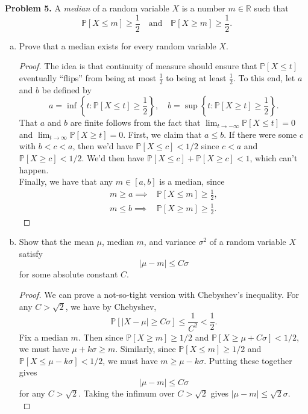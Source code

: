\documentclass[11pt,letterpaper]{report}
\newcommand{\reals}{\mathbb{R}}
\newcommand{\Prob}{\mathbb{P}}
\begin{document}
\noindent\textbf{Problem 5. }
A \textit{median} of a random variable $X$ is a number $m\in \reals$ such that
\[
\Prob[X\leq m]\geq \frac{1}{2}\quad\text{and}\quad \Prob[X\geq m]\geq \frac{1}{2}.
\]
\begin{enumerate}[(a)]
	\item Prove that a median exists for every random variable $X$.
	\begin{proof}
		The idea is that continuity of measure should ensure that $\Prob[X\leq t]$ eventually ``flips'' from being at most $\frac{1}{2}$ to being at least $\frac{1}{2}$. To this end, let $a$ and $b$ be defined by
		\[
		a = \inf\left\{t: \Prob[X\leq t]\geq \frac{1}{2}\right\},\quad b = \sup\left\{t: \Prob[X\geq t]\geq \frac{1}{2}\right\}.
		\]
		That $a$ and $b$ are finite follows from the fact that $\lim_{t\to -\infty}\Prob[X\leq t] = 0$ and $\lim_{t\to \infty}\Prob[X\geq t] = 0$. First, we claim that $a\leq b$. If there were some $c$ with $b<c<a$, then we'd have $\Prob[X\leq c]< 1/2$ since $c<a$ and $\Prob[X\geq c]<1/2$. We'd then have $\Prob[X\leq c] + \Prob[X\geq c]<1$, which can't happen.\\

		\noindent Finally, we have that any $m\in [a,b]$ is a median, since
		\begin{align*}
			m\geq a\implies & \Prob[X\leq m]\geq \frac{1}{2},\\
			m\leq b\implies & \Prob[X\geq m]\geq \frac{1}{2}.
		\end{align*}
	\end{proof}

	\item Show that the mean $\mu$, median $m$, and variance $\sigma^2$ of a random variable $X$ satisfy
	\[
	|\mu-m|\leq C\sigma
	\]
	for some absolute constant $C$.
	\begin{proof}
		We can prove a not-so-tight version with Chebyshev's inequality. For any $C>\sqrt{2}$, we have by Chebyshev,
		\[
		\Prob[|X-\mu|\geq C\sigma]\leq \frac{1}{C^2}<\frac{1}{2}.
		\]
		Fix a median $m$. Then since $\Prob[X\geq m]\geq 1/2$ and $\Prob[X\geq \mu+C\sigma]<1/2$, we must have $\mu+k\sigma\geq m$. Similarly, since $\Prob[X\leq m]\geq 1/2$ and $\Prob[X\leq \mu-k\sigma]<1/2$, we must have $m\geq \mu-k\sigma$. Putting these together gives
		\[
		|\mu-m|\leq C\sigma
		\]
		for any $C>\sqrt{2}$. Taking the infimum over $C>\sqrt{2}$ gives $|\mu-m|\leq \sqrt{2}\sigma$.\\
	\end{proof}
\end{enumerate}
\end{document}
